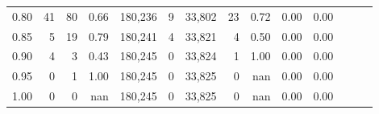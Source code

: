 \begin{tabular}{rrrrrrrrrrrrrr}
0.80 &      41 &     80 &  0.66 &  180,236 &        9 &  33,802 &      23 &  0.72 &  0.00 &      0.00 \\
0.85 &       5 &     19 &  0.79 &  180,241 &        4 &  33,821 &       4 &  0.50 &  0.00 &      0.00 \\
0.90 &       4 &      3 &  0.43 &  180,245 &        0 &  33,824 &       1 &  1.00 &  0.00 &      0.00 \\
0.95 &       0 &      1 &  1.00 &  180,245 &        0 &  33,825 &       0 &   nan &  0.00 &      0.00 \\
1.00 &       0 &      0 &   nan &  180,245 &        0 &  33,825 &       0 &   nan &  0.00 &      0.00 \\
\bottomrule
\end{tabular}
